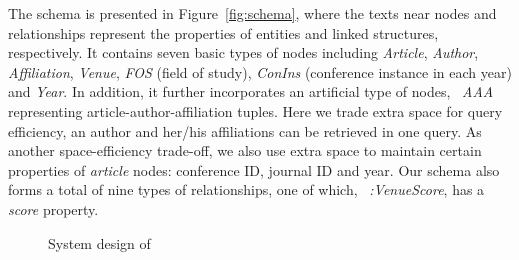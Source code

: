 The schema is presented in Figure~\ref{fig:schema}, where the texts near nodes and relationships represent the properties of entities and linked structures, respectively.
It contains seven basic types of nodes including {\em Article}, {\em Author}, {\em Affiliation}, {\em Venue}, {\em FOS} (field of study), {\em ConIns} (conference instance in each year) and {\em Year}.
In addition, it further incorporates an artificial type of nodes, \ie~{\em AAA} representing article-author-affiliation tuples. Here we trade extra space for query efficiency, \ie an author and her/his affiliations can be retrieved in one query.
As another space-efficiency trade-off, we also use extra space to maintain certain properties of  {\em article} nodes: conference ID, journal ID and year.
%
Our schema also forms a total of nine types of relationships, one of which, \ie~{\em :VenueScore}, has a {\em score} property.



\begin{figure}
\centering
{}
\vspace{-1ex}
\caption{System design of \oursystem}
\label{fig:system}
\vspace{-2ex}
\end{figure}


